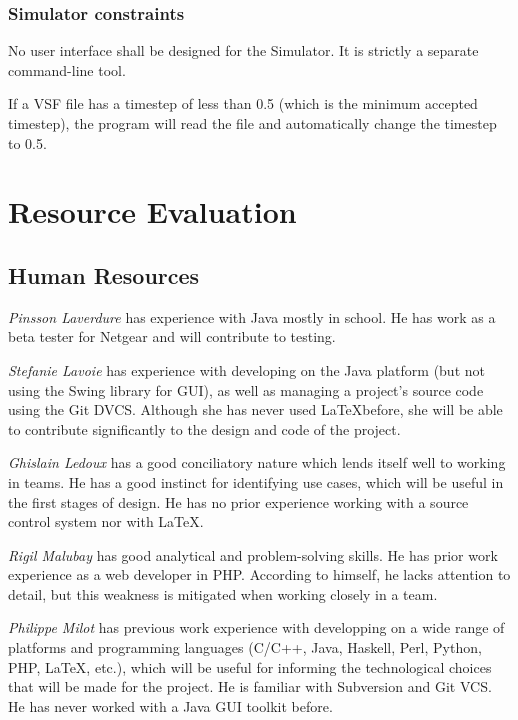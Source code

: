 \documentclass{article}
\begin{document}
\subsubsection{Simulator constraints}

No user interface shall be designed for the Simulator. It is strictly a separate command-line tool.

If a VSF file has a timestep of less than 0.5 (which is the minimum accepted timestep), the program will read the file and automatically change the timestep to 0.5.

\section{Resource Evaluation} %

\subsection{Human Resources} %

\emph{Pinsson Laverdure} has experience with Java mostly in school. He has work as a beta tester for Netgear and will contribute to testing.

\emph{Stefanie Lavoie} has experience with developing on the Java platform (but not using the Swing library for GUI), as well as managing a project's source code using the Git DVCS. Although she has never used \LaTeX before, she will be able to contribute significantly to the design and code of the project.

\emph{Ghislain Ledoux} has a good conciliatory nature which lends itself well to working in teams. He has a good instinct for identifying use cases, which will be useful in the first stages of design. He has no prior experience working with a source control system nor with \LaTeX.

\emph{Rigil Malubay} has good analytical and problem-solving skills. He has prior work experience as a web developer in PHP. According to himself, he lacks attention to detail, but this weakness is mitigated when working closely in a team.

\emph{Philippe Milot} has previous work experience with developping on a wide range of platforms and programming languages (C/C++, Java, Haskell, Perl, Python, PHP, \LaTeX, etc.), which will be useful for informing the technological choices that will be made for the project. He is familiar with Subversion and Git VCS. He has never worked with a Java GUI toolkit before.
\end{document}

